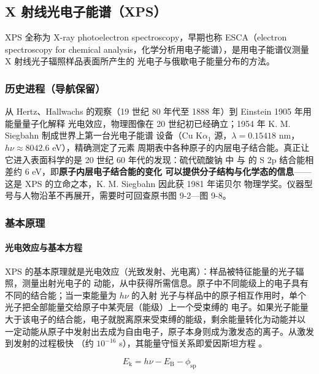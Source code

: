 \subsection{X 射线光电子能谱（XPS）}

XPS 全称为 X-ray photoelectron spectroscopy，早期也称 ESCA（electron spectroscopy for
chemical analysis，化学分析用电子能谱），是用电子能谱仪测量 X 射线光子辐照样品表面所产生的
光电子与俄歇电子能量分布的方法。

\subsubsection{历史进程（导航保留）}

从 Hertz、Hallwachs 的观察（19 世纪 80 年代至 1888 年）到 Einstein 1905 年用能量量子化解释
光电效应，物理图像在 20 世纪初已经确立；1954 年 K. M. Siegbahn 制成世界上第一台光电子能谱
设备（Cu K$\alpha_{1}$ 源，$\lambda=0.15418$ nm，$h\nu\approx8042.6$ eV），精确测定了元素
周期表中各种原子的内层电子结合能。真正让它进入表面科学的是 20 世纪 60 年代的发现：硫代硫酸钠
中  与  的 S 2p 结合能相差约 6 eV，即\textbf{原子内层电子结合能的变化
可以提供分子结构与化学态的信息}——这是 XPS 的立命之本，K. M. Siegbahn 因此获 1981 年诺贝尔
物理学奖。仪器型号与人物沿革不再展开，需要时可回查原书图 9-2—图 9-8。

\subsubsection{基本原理}

\paragraph{光电效应与基本方程}

\begin{principle}
XPS 的基本原理就是光电效应（光致发射、光电离）：样品被特征能量的光子辐照，测量出射光电子的
动能，从中获得所需信息。原子中不同能级上的电子具有不同的结合能；当一束能量为 $h\nu$ 的入射
光子与样品中的原子相互作用时，单个光子把全部能量交给原子中某壳层（能级）上一个受束缚的
电子。如果光子能量大于该电子的结合能，电子就脱离原来受束缚的能级，剩余能量转化为动能并以
一定动能从原子中发射出去成为自由电子，原子本身则成为激发态的离子。从激发到发射的过程极快
（约 $10^{-16}$ s），其能量守恒关系即爱因斯坦方程 。
\end{principle}

\begin{equation}\label{eq:xps}
E_{\mathrm{k}}=h\nu-E_{\mathrm{B}}-\phi_{\mathrm{sp}}
\end{equation}

